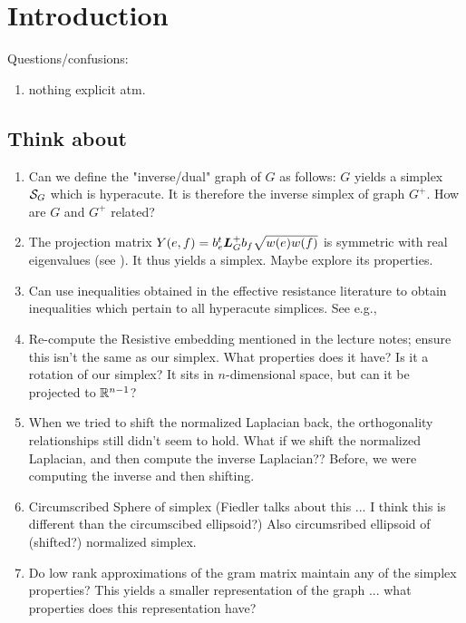 \chapter{Introduction}

Questions/confusions: 
\begin{enumerate}
\item nothing explicit atm. 

\end{enumerate}



\section{Think about}
\begin{enumerate}
	\item Can we define the "inverse/dual" graph of $G$ as follows: $G$ yields a simplex $\mathcal{S}_G$ which is hyperacute. It is therefore the inverse simplex of  graph $G^+$. How are $G$ and $G^+$ related?
	\item The projection matrix $Y(e,f)=b_e^t \vb*{L}_G^+b_f\sqrt{w(e)w(f)}$ is symmetric with real eigenvalues (see \cite{vishnoi2013lx}). It thus yields a simplex. Maybe explore its properties. 
	\item Can use inequalities obtained in the effective resistance literature to obtain inequalities which pertain to all hyperacute simplices. See e.g.,\cite{alev2017graph} 
\item Re-compute the Resistive embedding mentioned in the lecture notes; ensure this isn't the same as our simplex. What properties does it have? Is it a rotation of our simplex? It sits in $n$-dimensional space, but can it be projected to $\mathbb{R}^{n-1}$? 
\item When we tried to shift the normalized Laplacian back, the orthogonality relationships still didn't seem to hold. What if we shift the normalized Laplacian, and then compute the inverse Laplacian?? Before, we were computing the inverse and then shifting.  
\item Circumscribed Sphere of simplex (Fiedler talks about this ... I think this is different than the circumscibed ellipsoid?) Also circumsribed ellipsoid of (shifted?) normalized simplex. 
\item Do low rank approximations of the gram matrix maintain any of the simplex properties? This yields a smaller representation of the graph ... what properties does this representation have?

\end{enumerate}
